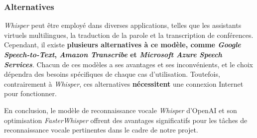 \subsubsection*{Alternatives}
\textit{Whisper} peut être employé dans diverses applications, telles que les assistants virtuels multilingues, la traduction de la parole et la transcription de conférences.
Cependant, il existe \textbf{plusieurs alternatives à ce modèle, comme \textit{Google Speech-to-Text}, \textit{Amazon Transcribe} et \textit{Microsoft Azure Speech Services}}.
Chacun de ces modèles a ses avantages et ses inconvénients, et le choix dépendra des besoins spécifiques de chaque cas d'utilisation. Toutefois, contrairement à \textit{Whisper}, ces alternatives \textbf{nécessitent} une connexion Internet pour fonctionner.

En conclusion, le modèle de reconnaissance vocale \textit{Whisper} d'OpenAI et
son optimisation \textit{FasterWhisper} offrent des avantages significatifs
pour les tâches de reconnaissance vocale pertinentes dans le cadre de notre
projet.